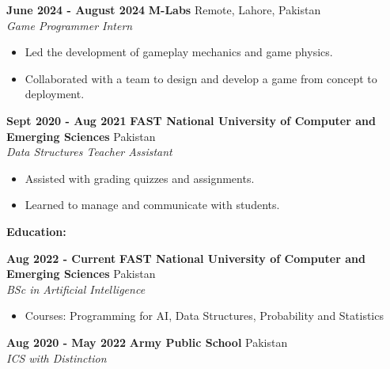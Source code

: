 \documentclass[a4paper,10pt]{article}
\begin{document}
\vspace{5pt}

\textbf{June 2024 - August 2024} \hfill \textbf{M-Labs} \hfill Remote, Lahore, Pakistan\\
\textit{Game Programmer Intern}
\begin{itemize}
    \item Led the development of gameplay mechanics and game physics.
    \item Collaborated with a team to design and develop a game from concept to deployment.
\end{itemize}

\vspace{5pt}

\textbf{Sept 2020 - Aug 2021} \hfill \textbf{FAST National University of Computer and Emerging Sciences} \hfill Pakistan\\
\textit{Data Structures Teacher Assistant}
\begin{itemize}
    \item Assisted with grading quizzes and assignments.
    \item Learned to manage and communicate with students.
\end{itemize}

\vspace{5pt}

\textbf{Education:}

\vspace{5pt}

\textbf{Aug 2022 - Current} \hfill \textbf{FAST National University of Computer and Emerging Sciences} \hfill Pakistan\\
\textit{BSc in Artificial Intelligence}
\begin{itemize}
    \item Courses: Programming for AI, Data Structures, Probability and Statistics
\end{itemize}

\vspace{5pt}

\textbf{Aug 2020 - May 2022} \hfill \textbf{Army Public School} \hfill Pakistan\\
\textit{ICS with Distinction}

\vspace{5pt}
\end{document}
